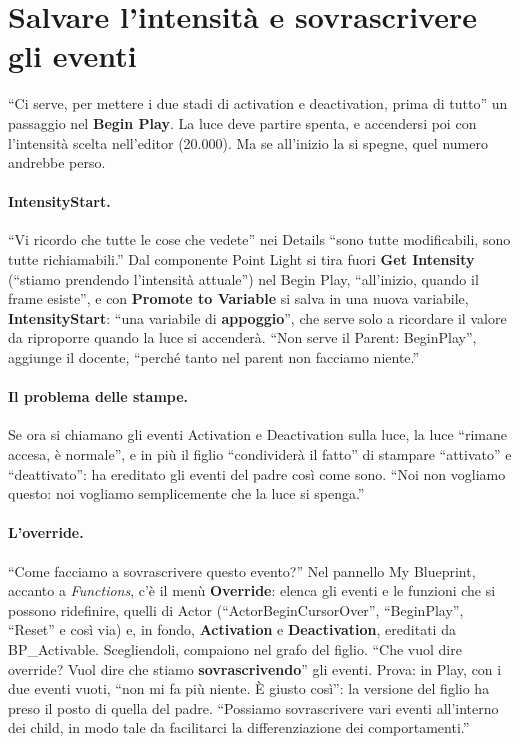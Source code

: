 \section{Salvare l'intensità e sovrascrivere gli eventi}
\label{ue7:sec:override}

``Ci serve, per mettere i due stadi di activation e deactivation, prima di tutto'' un
passaggio nel \textbf{Begin Play}. La luce deve partire spenta, e accendersi poi con
l'intensità scelta nell'editor (20.000). Ma se all'inizio la si spegne, quel numero
andrebbe perso.

\paragraph{IntensityStart.} ``Vi ricordo che tutte le cose che vedete'' nei Details
``sono tutte modificabili, sono tutte richiamabili.'' Dal componente Point Light si tira
fuori \textbf{Get Intensity} (``stiamo prendendo l'intensità attuale'') nel Begin Play,
``all'inizio, quando il frame esiste'', e con \textbf{Promote to Variable} si salva in
una nuova variabile, \textbf{IntensityStart}: ``una variabile di \textbf{appoggio}'',
che serve solo a ricordare il valore da riproporre quando la luce si accenderà. ``Non
serve il Parent: BeginPlay'', aggiunge il docente, ``perché tanto nel parent non facciamo
niente.''

\paragraph{Il problema delle stampe.} Se ora si chiamano gli eventi Activation e
Deactivation sulla luce, la luce ``rimane accesa, è normale'', e in più il figlio
``condividerà il fatto'' di stampare ``attivato'' e ``deattivato'': ha ereditato gli
eventi del padre così come sono. ``Noi non vogliamo questo: noi vogliamo semplicemente
che la luce si spenga.''

\paragraph{L'override.} ``Come facciamo a sovrascrivere questo evento?'' Nel pannello My
Blueprint, accanto a \emph{Functions}, c'è il menù \textbf{Override}: elenca gli eventi
e le funzioni che si possono ridefinire, quelli di Actor (``ActorBeginCursorOver'',
``BeginPlay'', ``Reset'' e così via) e, in fondo, \textbf{Activation} e
\textbf{Deactivation}, ereditati da BP\_Activable. Scegliendoli, compaiono nel grafo del
figlio. ``Che vuol dire override? Vuol dire che stiamo \textbf{sovrascrivendo}'' gli
eventi. Prova: in Play, con i due eventi vuoti, ``non mi fa più niente. È giusto così'':
la versione del figlio ha preso il posto di quella del padre. ``Possiamo sovrascrivere
vari eventi all'interno dei child, in modo tale da facilitarci la differenziazione dei
comportamenti.''

